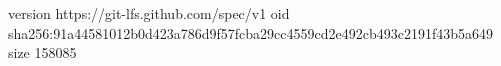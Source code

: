 version https://git-lfs.github.com/spec/v1
oid sha256:91a44581012b0d423a786d9f57fcba29cc4559cd2e492cb493c2191f43b5a649
size 158085
